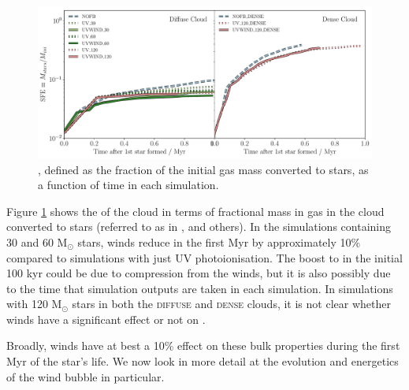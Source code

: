 \documentclass[a4paper,fleqn,usenatbib]{mnras}
\newcommand{\Msolar}{M$_{\odot}$\xspace}
\begin{document}

\begin{figure}
	\includegraphics[width=2\columnwidth]{plots/fig3a.pdf}
	\caption{\protect\SFE, defined as the fraction of the initial gas mass converted to stars, as a function of time in each simulation.}
	\label{fig:tsfe}
\end{figure}

Figure \ref{fig:tsfe} shows the \SFE of the cloud in terms of fractional mass in gas in the cloud converted to stars (referred to as \TSFE in \cite{Geen2017}, \cite{He2019} and others). In the simulations containing 30 and 60 \Msolar stars, winds reduce \SFE in the first Myr by approximately 10\% compared to simulations with just UV photoionisation. The boost to \SFE in the initial 100 kyr could be due to compression from the winds, but it is also possibly due to the time that simulation outputs are taken in each simulation. In simulations with 120 \Msolar stars in both the \textsc{diffuse} and \textsc{dense} clouds, it is not clear whether winds have a significant effect or not on \SFE.

Broadly, winds have at best a 10\% effect on these bulk properties during the first Myr of the star's life. We now look in more detail at the evolution and energetics of the wind bubble in particular.
\end{document}
